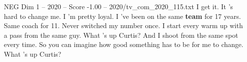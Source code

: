 \begin{textsample}{NEG Dim 1 – 2020 – Score -1.00 – 2020/tv\_com\_2020\_115.txt}  \label{ex:f1_neg_010}
I get it.
It 's hard to change me.
I 'm pretty loyal.
I 've been on the same \textbf{team} for 17 years.
Same coach for 11.
Never switched my number once.
I start every warm up with a pass from the same guy.
What 's up Curtis?
And I shoot from the same spot every time.
So you can imagine how good something has to be for me to change.
What 's up Curtis?

\end{textsample}
